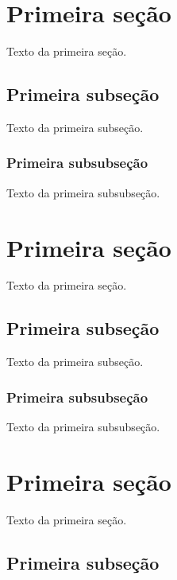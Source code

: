 \documentclass[a4paper,12pt,oneside,onecolumn,final,fleqn]{config/repUERJ}
\begin{document}
\section{Primeira seção}

Texto da primeira seção.

\subsection{Primeira subseção}

Texto da primeira subseção.

\subsubsection{Primeira subsubseção}

Texto da primeira subsubseção.
\section{Primeira seção}

Texto da primeira seção.

\subsection{Primeira subseção}

Texto da primeira subseção.

\subsubsection{Primeira subsubseção}

Texto da primeira subsubseção.
\annex
\section{Primeira seção}

Texto da primeira seção.

\subsection{Primeira subseção}
\end{document}
